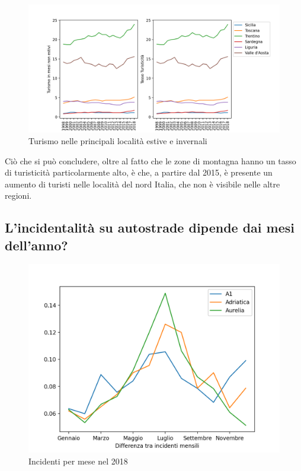 \documentclass[a4paper]{report}
\begin{document}
\begin{figure}
    \includegraphics[width=\linewidth]{../src/turismo/turismo.png}
    \caption{Turismo nelle principali località estive e invernali}
    \label{fig:turismo}
\end{figure}

Ciò che si può concludere, oltre al fatto che le zone di montagna hanno 
un tasso di turisticità particolarmente alto, 
è che, a partire dal 2015, è presente un aumento di turisti nelle località del 
nord Italia, che non è visibile nelle altre regioni.


\subsection{L'incidentalità su autostrade dipende dai mesi dell'anno?}
\begin{figure}
    \includegraphics[width=\linewidth]{../src/incidenti/incidenti_aci/autostrade/mesi_autostrade.png}
    \caption{Incidenti per mese nel 2018}
    \label{fig:incidenti-per-mese}
\end{figure}
\end{document}
